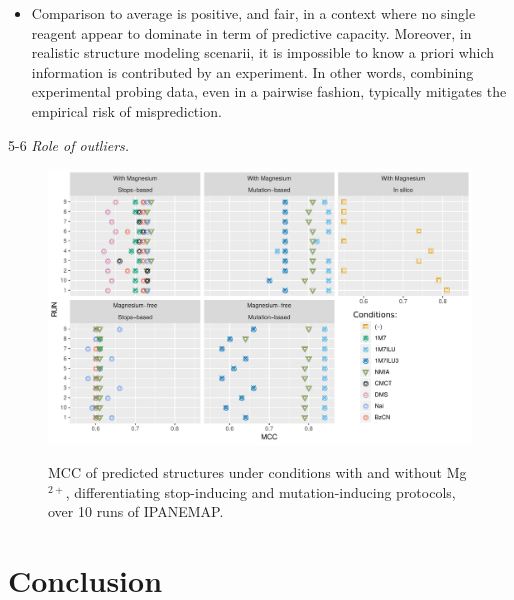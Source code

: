 \documentclass[a4,center,fleqn]{NAR}
\newcommand{\Blabla}[1][5-6]{{\color{blue!40!white}\lipsum*[#1]}}
\begin{document}
\begin{itemize}
	\item Comparison to average is positive, and fair, in a context where no single reagent appear to dominate in term of predictive capacity. Moreover, in realistic structure modeling scenarii, it is impossible to know a priori which information is contributed by an experiment. In other words, combining experimental probing data, even in a pairwise fashion, typically mitigates the empirical risk of misprediction.
\end{itemize}



\Blabla{5-6}
{\em Role of outliers.} 


\begin{figure}
	{\centering\includegraphics[width=1\linewidth]{graphs/Reproductibility}\\}
	
	\caption{MCC of predicted structures under conditions with and without Mg$^{2+}$, differentiating stop-inducing and mutation-inducing protocols, over 10 runs of IPANEMAP. }\label{fig:biclustering}
\end{figure}


\Blabla[5-6]




\section{Conclusion}
\end{document}
